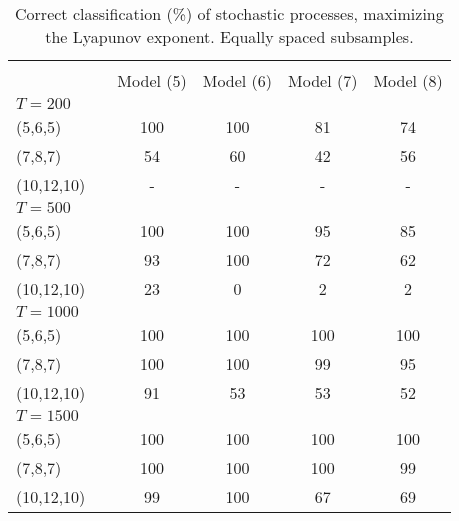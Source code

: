 \documentclass[12pt]{article}
\begin{document}
\begin{table} [H]\scriptsize
    \caption{ Correct classification (\%) of stochastic processes, maximizing the Lyapunov exponent. Equally spaced subsamples.}
    \begin{tabular*}{\textwidth}{@{\extracolsep{\fill}}lccccc}
        \hline &  &  &  & &   \\ 
          &  &  Model (5) & Model (6)  & Model (7) & Model (8)  \\ 
        $T=200$  &  &  &  & &   \\
        (5,6,5)                           &    & 100 & 100  & 81 &  74 \\ 
        (7,8,7)                           &    &  54 &  60  & 42 &  56 \\ 
        (10,12,10)                        &    &  -  & -    & -  & -\\ 
        \hline 
                
         $T=500$  &  &   & & &   \\ 

        (5,6,5)                           &   & 100 & 100  & 95 & 85 \\ 
        (7,8,7)                           &   & 93  & 100  & 72 & 62 \\ 
        (10,12,10)                        &   & 23  &  0  &  2 &  2 \\ 
\hline 
         $T=1000$  &  &   &   &  &  \\ 

        (5,6,5)                           &  &  100   & 100 & 100 &  100  \\ 
        (7,8,7)                           &  &  100   & 100 & 99  &   95 \\ 
        (10,12,10)                        &  &    91  &  53 &  53 &   52 \\ 
\hline      
         $T=1500$  &  &   &   &  &  \\ 

        (5,6,5)                           &  &  100   & 100 & 100 & 100 \\ 
        (7,8,7)                           &  &  100    & 100 & 100 & 99  \\ 
        (10,12,10)                        &  &  99    &  100  & 67 & 69 \\ 
\hline      
    \end{tabular*}
\end{table}
\end{document}
